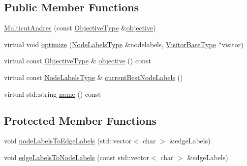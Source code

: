 \subsection*{Public Member Functions}
\begin{DoxyCompactItemize}
\item 
\hyperlink{classnifty_1_1graph_1_1opt_1_1multicut_1_1MulticutAndres_a0995daba89398a444065df5227737ac6}{Multicut\+Andres} (const \hyperlink{classnifty_1_1graph_1_1opt_1_1multicut_1_1MulticutAndres_aed60c2f4ed9c6c6b97e8b513d7a48e86}{Objective\+Type} \&\hyperlink{classnifty_1_1graph_1_1opt_1_1multicut_1_1MulticutAndres_a957dcf0e0fe86e29d14a154141a1458f}{objective})
\item 
virtual void \hyperlink{classnifty_1_1graph_1_1opt_1_1multicut_1_1MulticutAndres_aa938eb1da7b3af5e0e5935e7bd818c61}{optimize} (\hyperlink{classnifty_1_1graph_1_1opt_1_1multicut_1_1MulticutAndres_a6cd9d64abc4a98aa9745ce1ef0d4ecfe}{Node\+Labels\+Type} \&nodelabels, \hyperlink{classnifty_1_1graph_1_1opt_1_1multicut_1_1MulticutAndres_a295da342b6ebe8a8720cadd1dcce2e57}{Visitor\+Base\+Type} $\ast$visitor)
\item 
virtual const \hyperlink{classnifty_1_1graph_1_1opt_1_1multicut_1_1MulticutAndres_aed60c2f4ed9c6c6b97e8b513d7a48e86}{Objective\+Type} \& \hyperlink{classnifty_1_1graph_1_1opt_1_1multicut_1_1MulticutAndres_a957dcf0e0fe86e29d14a154141a1458f}{objective} () const
\item 
virtual const \hyperlink{classnifty_1_1graph_1_1opt_1_1multicut_1_1MulticutAndres_a6cd9d64abc4a98aa9745ce1ef0d4ecfe}{Node\+Labels\+Type} \& \hyperlink{classnifty_1_1graph_1_1opt_1_1multicut_1_1MulticutAndres_ad49ef5b1f23c054abb4521445871b9b4}{current\+Best\+Node\+Labels} ()
\item 
virtual std\+::string \hyperlink{classnifty_1_1graph_1_1opt_1_1multicut_1_1MulticutAndres_ac7a32dbee9103beb72ba2cf6fcd6ecee}{name} () const
\end{DoxyCompactItemize}
\subsection*{Protected Member Functions}
\begin{DoxyCompactItemize}
\item 
void \hyperlink{classnifty_1_1graph_1_1opt_1_1multicut_1_1MulticutAndres_abce35dff7d396cade66f8f7611e141f4}{node\+Labels\+To\+Edge\+Labels} (std\+::vector$<$ char $>$ \&edge\+Labels)
\item 
void \hyperlink{classnifty_1_1graph_1_1opt_1_1multicut_1_1MulticutAndres_ae9d13d3f75cc738cb1b5fbe69f98fcaa}{edge\+Labels\+To\+Node\+Labels} (const std\+::vector$<$ char $>$ \&edge\+Labels)
\end{DoxyCompactItemize}
